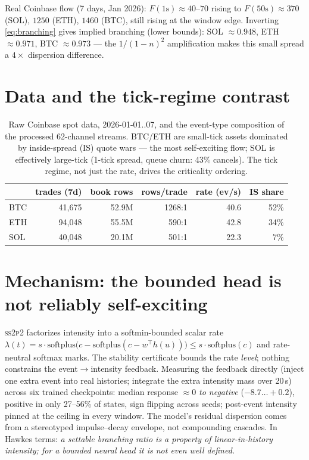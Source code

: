 \documentclass[11pt]{article}
\newcommand{\sspp}{\textsc{ss2p2}}
\newcommand{\Fano}{F}
\begin{document}
Real Coinbase flow (7 days, Jan 2026): $\Fano(1\text{s})\approx 40$--$70$ rising to
$\Fano(50\text{s})\approx 370$ (SOL), $1250$ (ETH), $1460$ (BTC), still rising at the
window edge. Inverting \eqref{eq:branching} gives implied branching (lower bounds):
SOL $\approx 0.948$, ETH $\approx 0.971$, BTC $\approx 0.973$ --- the
$1/(1-n)^2$ amplification makes this small spread a $4\times$ dispersion difference.

\section{Data and the tick-regime contrast}

\begin{table}[h]\centering\small
\begin{tabular}{lrrrrr}
\toprule
 & trades (7d) & book rows & rows/trade & rate (ev/s) & IS share \\
\midrule
BTC & 41{,}675 & 52.9M & 1268:1 & 40.6 & 52\% \\
ETH & 94{,}048 & 55.5M & 590:1 & 42.8 & 34\% \\
SOL & 40{,}048 & 20.1M & 501:1 & 22.3 & 7\% \\
\bottomrule
\end{tabular}
\caption{Raw Coinbase spot data, 2026-01-01..07, and the event-type composition of the
processed 62-channel streams. BTC/ETH are small-tick assets dominated by inside-spread
(IS) quote wars --- the most self-exciting flow; SOL is effectively large-tick
(1-tick spread, queue churn: 43\% cancels). The tick regime, not just the rate,
drives the criticality ordering.}
\label{tab:assets}
\end{table}

\section{Mechanism: the bounded head is not reliably self-exciting}

\sspp{} factorizes intensity into a softmin-bounded scalar rate
$\lambda(t)=s\cdot\mathrm{softplus}\!\big(c-\mathrm{softplus}(c-w^\top h(u))\big)
\le s\cdot\mathrm{softplus}(c)$ and rate-neutral softmax marks. The stability
certificate bounds the rate \emph{level}; nothing constrains the event$\to$intensity
feedback. Measuring the feedback directly (inject one extra event into real histories;
integrate the extra intensity mass over 20\,s) across six trained checkpoints: median
response $\approx 0$ \emph{to negative} ($-8.7\ldots+0.2$), positive in only
27--56\% of states, sign flipping across seeds; post-event intensity pinned at the
ceiling in every window. The model's residual dispersion comes from a stereotyped
impulse--decay envelope, not compounding cascades. In Hawkes terms:
\emph{a settable branching ratio is a property of linear-in-history intensity; for a
bounded neural head it is not even well defined.}
\end{document}
